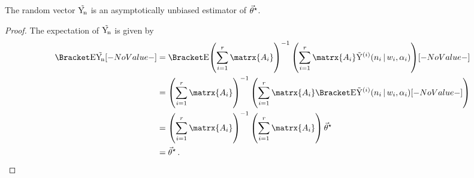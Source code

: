 \documentclass[ ../main.tex]{subfiles}
\begin{document}
\begin{theorem}
The random vector $\mathrm{\vec{Y_{\!n}}}$ is an asymptotically unbiased estimator of ${\vec{\theta}}^{\star}$.
\end{theorem}
\begin{proof}
The expectation of $\mathrm{\vec{Y_{\!n}}}$ is given by
\begin{align}
    \Expect{\sampdu}
    &= \Expect{\left( \sum_{i=1}^{r} \matrx{A_i} \right)^{-1} \left( \sum_{i=1}^{r} \matrx{A_i} \sampdir{n_i}{w_i,\alpha_i}{i} \right)}\\
    &=  \left( \sum_{i=1}^{r} \matrx{A_i} \right)^{-1}
            \left( \sum_{i=1}^{r} \matrx{A_i}
            \Expect{\sampdir{n_i}{w_i,\alpha_i}{i}}\right)\\    
    &= \left( \sum_{i=1}^{r} \matrx{A_i} \right)^{-1} \left(\sum_{i=1}^{r} \matrx{A_i} \right) \tparam\sysparamvec\\
    &= \tparam\sysparamvec\,.
\end{align}
\end{proof}
\end{document}

